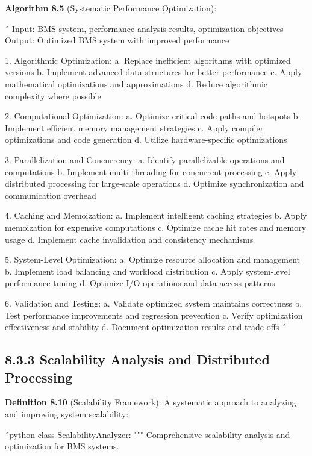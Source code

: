 \textbf{Algorithm 8.5} (Systematic Performance Optimization):

\texttt{`}
Input: BMS system, performance analysis results, optimization objectives
Output: Optimized BMS system with improved performance

1. Algorithmic Optimization:
   a. Replace inefficient algorithms with optimized versions
   b. Implement advanced data structures for better performance
   c. Apply mathematical optimizations and approximations
   d. Reduce algorithmic complexity where possible
   
2. Computational Optimization:
   a. Optimize critical code paths and hotspots
   b. Implement efficient memory management strategies
   c. Apply compiler optimizations and code generation
   d. Utilize hardware-specific optimizations
   
3. Parallelization and Concurrency:
   a. Identify parallelizable operations and computations
   b. Implement multi-threading for concurrent processing
   c. Apply distributed processing for large-scale operations
   d. Optimize synchronization and communication overhead
   
4. Caching and Memoization:
   a. Implement intelligent caching strategies
   b. Apply memoization for expensive computations
   c. Optimize cache hit rates and memory usage
   d. Implement cache invalidation and consistency mechanisms
   
5. System-Level Optimization:
   a. Optimize resource allocation and management
   b. Implement load balancing and workload distribution
   c. Apply system-level performance tuning
   d. Optimize I/O operations and data access patterns
   
6. Validation and Testing:
   a. Validate optimized system maintains correctness
   b. Test performance improvements and regression prevention
   c. Verify optimization effectiveness and stability
   d. Document optimization results and trade-offs
\texttt{`}

\subsection{8.3.3 Scalability Analysis and Distributed Processing}

\textbf{Definition 8.10} (Scalability Framework): A systematic approach to analyzing and improving system scalability:

\texttt{`}python
class ScalabilityAnalyzer:
    """
    Comprehensive scalability analysis and optimization for BMS systems.
    

